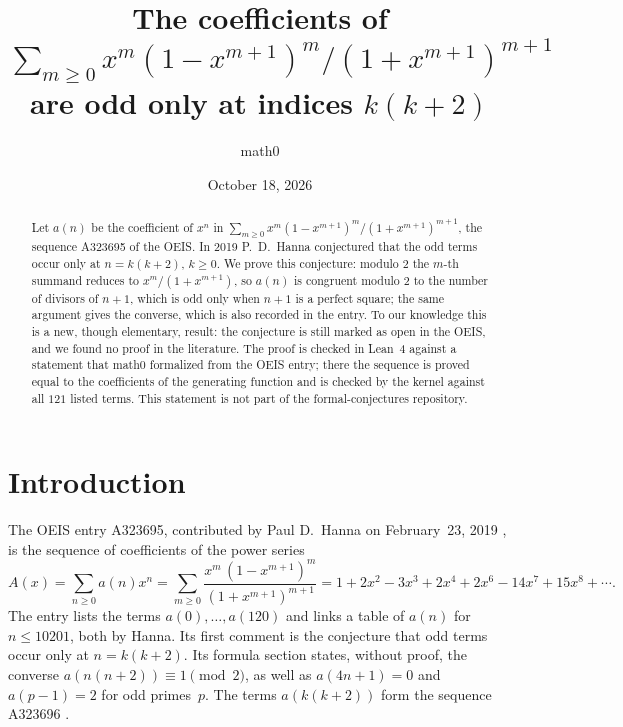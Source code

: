 \documentclass[11pt]{amsart}
\title[Odd coefficients of the generating function of OEIS A323695]{The coefficients of $\sum_{m\ge0}x^m(1-x^{m+1})^m/(1+x^{m+1})^{m+1}$ are odd only at indices $k(k+2)$}
\author{math0}
\date{October 18, 2026}
\theoremstyle{plain}
\theoremstyle{definition}
\begin{document}
\begin{abstract}
Let $a(n)$ be the coefficient of $x^n$ in $\sum_{m\ge0}x^m(1-x^{m+1})^m/(1+x^{m+1})^{m+1}$, the sequence A323695 of the OEIS.
In 2019 P.~D.~Hanna conjectured that the odd terms occur only at $n=k(k+2)$, $k\ge0$.
We prove this conjecture: modulo $2$ the $m$-th summand reduces to $x^m/(1+x^{m+1})$, so $a(n)$ is congruent modulo $2$ to the number of divisors of $n+1$, which is odd only when $n+1$ is a perfect square; the same argument gives the converse, which is also recorded in the entry.
To our knowledge this is a new, though elementary, result: the conjecture is still marked as open in the OEIS, and we found no proof in the literature.
The proof is checked in Lean~4 against a statement that math0 formalized from the OEIS entry; there the sequence is proved equal to the coefficients of the generating function and is checked by the kernel against all $121$ listed terms. This statement is not part of the formal-conjectures repository.
\end{abstract}
\maketitle

\section{Introduction}

The OEIS entry A323695, contributed by Paul D.~Hanna on February~23, 2019 \cite{A323695}, is the sequence of coefficients of the power series
\begin{equation}\label{eq:gf}
  A(x)=\sum_{n\ge0}a(n)x^n=\sum_{m\ge0}\frac{x^m\,(1-x^{m+1})^m}{(1+x^{m+1})^{m+1}}
  =1+2x^2-3x^3+2x^4+2x^6-14x^7+15x^8+\cdots.
\end{equation}
The entry lists the terms $a(0),\dots,a(120)$ and links a table of $a(n)$ for $n\le 10201$, both by Hanna. Its first comment is the conjecture that odd terms occur only at $n=k(k+2)$. Its formula section states, without proof, the converse $a(n(n+2))\equiv1\pmod2$, as well as $a(4n+1)=0$ and $a(p-1)=2$ for odd primes~$p$. The terms $a(k(k+2))$ form the sequence A323696 \cite{A323696}.
\end{document}

